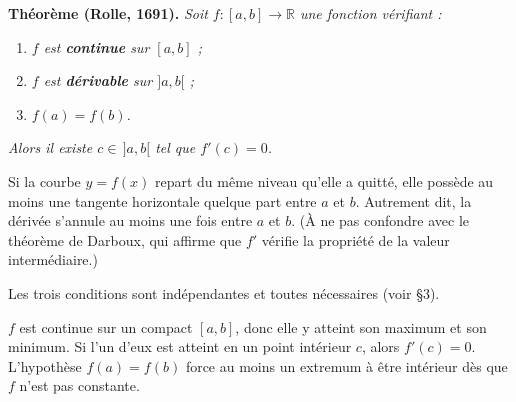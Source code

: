 ﻿%



\begin{tcolorbox}[thmbox]
  \textbf{Théorème (Rolle, 1691).}\enspace%
  \textit{Soit $f : [a,b] \to \mathbb{R}$ une fonction vérifiant :}
  \begin{enumerate}
    \item \textit{$f$ est \textbf{continue} sur $[a,b]$ ;}
    \item \textit{$f$ est \textbf{dérivable} sur $]a,b[$ ;}
    \item \textit{$f(a) = f(b)$.}
  \end{enumerate}
  \textit{Alors il existe $c \in\, ]a,b[$ tel que $f'(c) = 0$.}
\end{tcolorbox}

Si la courbe $y = f(x)$ repart du même niveau qu'elle a quitté, elle possède
au moins une tangente horizontale quelque part entre $a$ et $b$.
Autrement dit, la dérivée s'annule au moins une fois entre $a$ et $b$.
(À ne pas confondre avec le théorème de Darboux, qui affirme que $f'$
vérifie la propriété de la valeur intermédiaire.)

Les trois conditions sont indépendantes et toutes nécessaires (voir §3).

\decsep{}


\begin{ideepreuve}
$f$ est continue sur un compact $[a,b]$, donc elle y atteint son maximum et son
minimum. Si l'un d'eux est atteint en un point intérieur $c$, alors $f'(c) = 0$.
L'hypothèse $f(a)=f(b)$ force au moins un extremum à être intérieur dès que $f$
n'est pas constante.
\end{ideepreuve}

